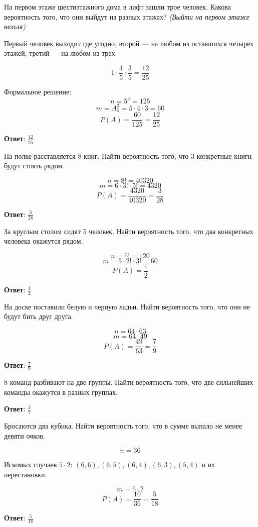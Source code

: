 \begin{exercise}
    На первом этаже шестиэтажного дома в лифт зашли трое человек. Какова вероятность того, что они выйдут на разных этажах? \textit{(Выйти на первом этаже нельзя)}

    Первый человек выходит где угодно, второй --- на любом из оставшихся четырех этажей, третий --- на любом из трех.

    \[1 \cdot \frac{4}{5} \cdot \frac{3}{5} = \frac{12}{25}\]

    Формальное решение:
    \[n = 5^3 = 125\]
    \[m = A_5^3 = 5\cdot 4\cdot 3 = 60\]
    \[P(A) = \frac{60}{125} = \frac{12}{25}\]

    \textbf{Ответ}: \(\frac{12}{25}\)
\end{exercise}

\begin{exercise}
    На полке расставляется 8 книг. Найти вероятность того, что 3 конкретные книги будут стоять рядом.

    \[n = 8! = 40320\]
    \[m = 6 \cdot 3! \cdot 5! = 4320\]
    \[P(A) = \frac{4320}{40320} = \frac{3}{28}\]

    \textbf{Ответ}: \(\frac{3}{28}\)
\end{exercise}

\begin{exercise}
    За круглым столом сидят 5 человек. Найти вероятность того, что два конкретных человека окажутся рядом.

    \[n = 5! = 120\]
    \[m = 5\cdot 2! \cdot 3! = 60\]
    \[P(A) = \frac{1}{2}\]

    \textbf{Ответ}: \(\frac{1}{2}\)
\end{exercise}

\begin{exercise}
    На доске поставили белую и черную ладьи. Найти вероятность того, что они не будут бить друг друга.

    \[n = 64 \cdot 63\]
    \[m = 64 \cdot 49\]
    \[P(A) = \frac{49}{63} = \frac{7}{9}\]

    \textbf{Ответ}: \(\frac{7}{9}\)
\end{exercise}

\begin{exercise}
    8 команд разбивают на две группы. Найти вероятность того, что две сильнейших команды окажутся в разных группах.

    \textbf{Ответ}: \(\frac{3}{7}\)
\end{exercise}

\begin{exercise}
    Бросаются два кубика. Найти вероятность того, что в сумме выпало не менее девяти очков.

    \[n = 36\]

    Искомых случаев \(5\cdot 2\): \((6, 6), (6, 5), (6, 4), (6, 3), (5, 4)\) и их перестановки.

    \[m = 5\cdot 2\]
    \[P(A) = \frac{10}{36} = \frac{5}{18}\]

    \textbf{Ответ}: \(\frac{5}{18}\)
\end{exercise}

